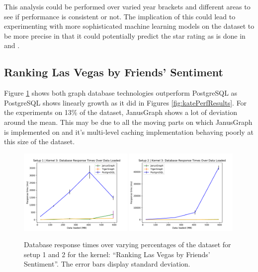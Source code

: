 This analysis could be performed over varied year brackets and different areas to see if performance is consistent or not. The implication of this could lead to experimenting with more sophisticated machine learning models on the dataset to be more precise in that it could potentially predict the star rating as is done in \cite{reddy2017prediction} and \cite{monett2016predicting}.

\subsection{Ranking Las Vegas by Friends' Sentiment}

Figure \ref{fig:cityPerfResults} shows both graph database technologies outperform PostgreSQL as PostgreSQL shows linearly growth as it did in Figures \ref{fig:katePerfResults}. For the experiments on 13\% of the dataset, JanusGraph shows a lot of deviation around the mean. This may be due to all the moving parts on which JanusGraph is implemented on and it's multi-level caching implementation behaving poorly at this size of the dataset.

\begin{figure}[h]
    \centering
    \includegraphics[width=0.49\textwidth]{img/7_yelpPerfResults/cityPlotSetup1.pdf}
    \includegraphics[width=0.49\textwidth]{img/7_yelpPerfResults/cityPlotSetup2.pdf}
    \caption{Database response times over varying percentages of the dataset for setup 1 and 2 for the kernel: ``Ranking Las Vegas by Friends' Sentiment''. The error bars display standard deviation.}
    \label{fig:cityPerfResults}
\end{figure}

